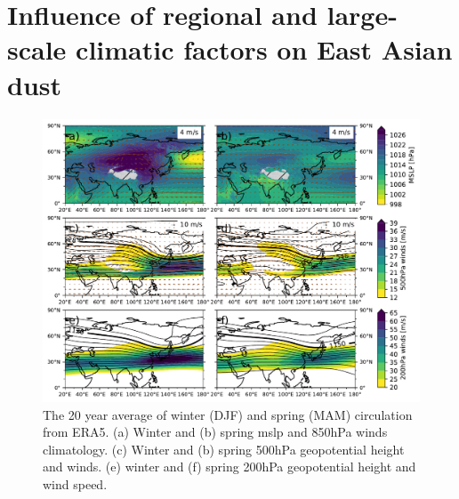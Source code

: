 \section{Influence of regional and large-scale climatic factors on East Asian dust}
\begin{figure}[htpb]
    \centering
    \includegraphics[width=\textwidth]{texfiles/figs/climatology_1999-2019.pdf}
    \caption{The 20 year average of winter (DJF)  and spring (MAM) circulation from ERA5. (a) Winter and (b) spring \acrshort{mslp} and 850hPa winds climatology. (c) Winter and (b) spring 500hPa geopotential height and winds. (e) winter and (f) spring 200hPa geopotential height and wind speed.}
    \label{fig:clim_circulation}
\end{figure}

